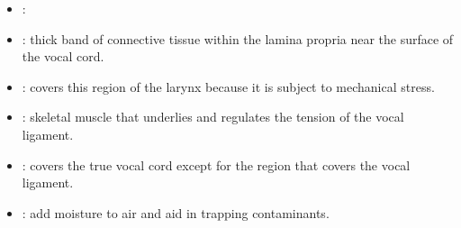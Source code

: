 \begin{multicols}{2}
\begin{itemize}
  \item {}:
  
  \begin{center}
  \end{center}
  
  \item {}:  thick band of connective tissue within the lamina propria near the surface of the vocal cord. 
  
  \begin{center}
  \end{center}
  
  \item {}: covers this region of the larynx because it is subject to mechanical stress.
  
  \begin{center}
  \end{center}
  
  \item {}: skeletal muscle that underlies and regulates the tension of the vocal ligament. 
  
  \begin{center}
  \end{center}

  \item {}: covers the true vocal cord except for the region that covers the vocal ligament.
  
  \begin{center}
  \end{center}
  
  \item {}: add moisture to air and aid in trapping contaminants.
  
  \begin{center}
  \end{center}
\end{itemize}
\end{multicols}

